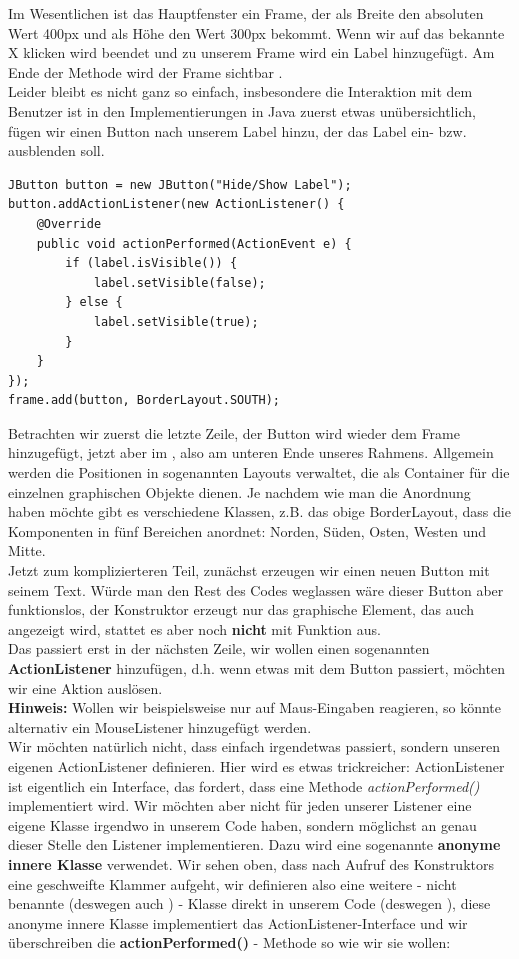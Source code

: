 \documentclass{article}
\begin{document}
Im Wesentlichen ist das Hauptfenster ein Frame, der als Breite den absoluten Wert 400px und als Höhe den Wert 300px bekommt. Wenn wir auf das bekannte X klicken wird beendet und zu unserem Frame wird ein Label hinzugefügt. Am Ende der Methode wird der Frame sichtbar . \\
Leider bleibt es nicht ganz so einfach, insbesondere die Interaktion mit dem Benutzer ist in den Implementierungen in Java zuerst etwas unübersichtlich, fügen wir einen Button nach unserem Label hinzu, der das Label ein- bzw. ausblenden soll. 
\begin{verbatim}
JButton button = new JButton("Hide/Show Label");
button.addActionListener(new ActionListener() {
    @Override
    public void actionPerformed(ActionEvent e) {
        if (label.isVisible()) {
            label.setVisible(false);
        } else {
            label.setVisible(true);
        }
    }
});
frame.add(button, BorderLayout.SOUTH);
\end{verbatim}
Betrachten wir zuerst die letzte Zeile, der Button wird wieder dem Frame hinzugefügt, jetzt aber im , also am unteren Ende unseres Rahmens. Allgemein werden die Positionen in sogenannten Layouts verwaltet, die als Container für die einzelnen graphischen Objekte dienen. Je nachdem wie man die Anordnung haben möchte gibt es verschiedene Klassen, z.B. das obige BorderLayout, dass die Komponenten in fünf Bereichen anordnet: Norden, Süden, Osten, Westen und Mitte. \\
Jetzt zum komplizierteren Teil, zunächst erzeugen wir einen neuen Button mit seinem Text. Würde man den Rest des Codes weglassen wäre dieser Button aber funktionslos, der Konstruktor erzeugt nur das graphische Element, das auch angezeigt wird, stattet es aber noch \textbf{nicht} mit Funktion aus. \\
Das passiert erst in der nächsten Zeile, wir wollen einen sogenannten \textbf{ActionListener} hinzufügen, d.h. wenn etwas mit dem Button passiert, möchten wir eine Aktion auslösen. \vspace{2mm}\\
\textbf{Hinweis:} Wollen wir beispielsweise nur auf Maus-Eingaben reagieren, so könnte alternativ ein MouseListener hinzugefügt werden. \vspace{2mm}\\
Wir möchten natürlich nicht, dass einfach irgendetwas passiert, sondern unseren eigenen ActionListener definieren. Hier wird es etwas trickreicher: ActionListener ist eigentlich ein Interface, das fordert, dass eine Methode \textit{actionPerformed()} implementiert wird. Wir möchten aber nicht für jeden unserer Listener eine eigene Klasse irgendwo in unserem Code haben, sondern möglichst an genau dieser Stelle den Listener implementieren. Dazu wird eine sogenannte \textbf{anonyme innere Klasse} verwendet. Wir sehen oben, dass nach Aufruf des Konstruktors eine geschweifte Klammer aufgeht, wir definieren also eine weitere - nicht benannte (deswegen auch ) - Klasse direkt in unserem Code (deswegen ), diese anonyme innere Klasse implementiert das ActionListener-Interface und wir überschreiben die \textbf{actionPerformed()} - Methode so wie wir sie wollen: \\
\end{document}
